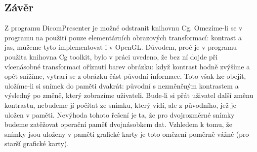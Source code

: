 \subsection{Závěr}
Z programu DicomPresenter je možné odstranit knihovnu Cg. Omezíme-li se v programu na použití pouze elementárních obrazových transformací: kontrast a jas, můžeme tyto implementovat i v OpenGL. Důvodem, proč je v programu použita knihovna Cg toolkit, bylo v práci \cite{neskudla} uvedeno, že bez ní dojde při vícenásobné transformaci oříznutí barev obrázku: když kontrast hodně zvýšíme a opět snížíme, vytrarí se z obrázku část původní informace. Toto však lze obejít, uložíme-li si snímek do paměti dvakrát: původní s nezměněným kontrastem a výsledný po změně, který zobrazíme uživateli. Bude-li si přát uživatel další změnu kontrastu, nebudeme jí počítat ze snímku, který vidí, ale z původního, jež je uložen v paměti. Nevýhoda tohoto řešení je ta, že pro dvojrozměrné snímky budeme zatěžovat operační paměť dvojnásobkem dat. Vzhledem k tomu, že snímky jsou uloženy v paměti grafické karty je toto omězení poměrně vážné (pro starší grafické karty).


